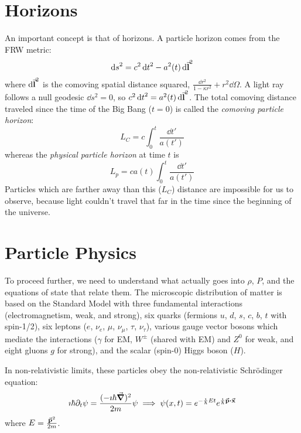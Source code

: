 \documentclass[a4paper,twoside,master.tex]{subfiles}
\begin{document}
\section{Horizons}\label{sec:horizons}

An important concept is that of horizons. A particle horizon comes from the FRW metric:
\begin{equation}
    \dd{s}^2 = c^2 \dd{t}^2 - a^2(t) \dd{\va{l}}^2
\end{equation}
where $ \dd{\va{l}}^2 $ is the comoving spatial distance squared, $ \frac{\dd{r}^2}{1 - \kappa r^2} + r^2 \dd{\Omega} $. A light ray follows a null geodesic $ \dd{s}^2 = 0 $, so $ c^2 \dd{t}^2 = a^2(t) \dd{\va{l}}^2 $. The total comoving distance traveled since the time of the Big Bang ($ t = 0 $) is called the \textit{comoving particle horizon}:
\begin{equation}
    L_C = c \int_0^t \frac{\dd{t'}}{a(t')}
\end{equation}
whereas the \textit{physical particle horizon} at time $ t $ is
\begin{equation}
    L_p = c a(t) \int^t_0 \frac{\dd{t'}}{a(t')}
\end{equation}
Particles which are farther away than this ($ L_C $) distance are impossible for us to observe, because light couldn't travel that far in the time since the beginning of the universe.

\section{Particle Physics}\label{sec:particle_physics}

To proceed further, we need to understand what actually goes into $ \rho $, $ P $, and the equations of state that relate them. The microscopic distribution of matter is based on the Standard Model with three fundamental interactions (electromagnetism, weak, and strong), six quarks (fermions $u$, $d$, $s$, $c$, $b$, $t$ with spin-1/2), six leptons ($ e $, $ \nu_e $, $ \mu $, $ \nu_{\mu} $, $ \tau $, $ \nu_{\tau} $), various gauge vector bosons which mediate the interactions ($ \gamma $ for EM, $ W^{\pm} $ (shared with EM) and $ Z^0 $ for weak, and eight gluons $ g $ for strong), and the scalar (spin-0) Higgs boson ($ H $).

In non-relativistic limits, these particles obey the non-relativistic Schr\"odinger equation:
\begin{equation}
    \imath \hbar \partial_t \psi = \frac{(- \imath \hbar \grad)^2}{2m} \psi \implies \psi(x,t) = e^{- \frac{\imath}{\hbar} E t} e^{\frac{\imath}{\hbar} \va{p} \vdot \va{x}}
\end{equation}
where $ E = \frac{\va{p}^2}{2m} $.
\end{document}
